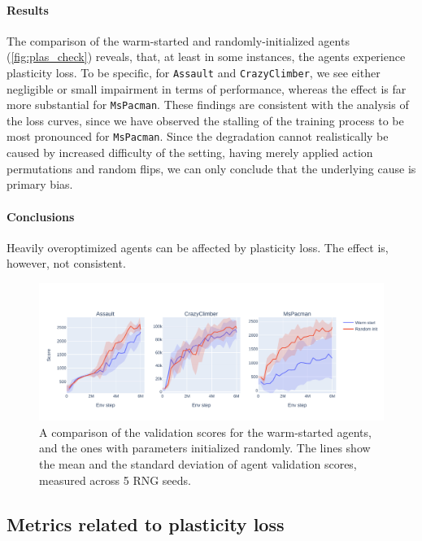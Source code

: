 \documentclass[en]{pracamgr}
\newcommand{\env}[1]{{\tt #1}}
\newcommand{\figurewidth}{\linewidth}
\newcommand{\figureheight}{0.8\paperheight}
\begin{document}
\paragraph{Results} The comparison of the warm-started and randomly-initialized agents (\autoref{fig:plas_check}) reveals, that, at least in some instances, the agents experience plasticity loss. To be specific, for \env{Assault} and \env{CrazyClimber}, we see either negligible or small impairment in terms of performance, whereas the effect is far more substantial for \env{MsPacman}. These findings are consistent with the analysis of the loss curves, since we have observed the stalling of the training process to be most pronounced for \env{MsPacman}. Since the degradation cannot realistically be caused by increased difficulty of the setting, having merely applied action permutations and random flips, we can only conclude that the underlying cause is primary bias.

\paragraph{Conclusions} Heavily overoptimized agents can be affected by plasticity loss. The effect is, however, not consistent.

\begin{figure}
  \centering
  \includegraphics[width=\figurewidth,height=\figureheight,keepaspectratio]{assets/plas_check.pdf}
  \caption{A comparison of the validation scores for the warm-started agents, and the ones with parameters initialized randomly. The lines show the mean and the standard deviation of agent validation scores, measured across 5 RNG seeds.}
  \label{fig:plas_check}
\end{figure}

\subsection{Metrics related to plasticity loss}
\end{document}
